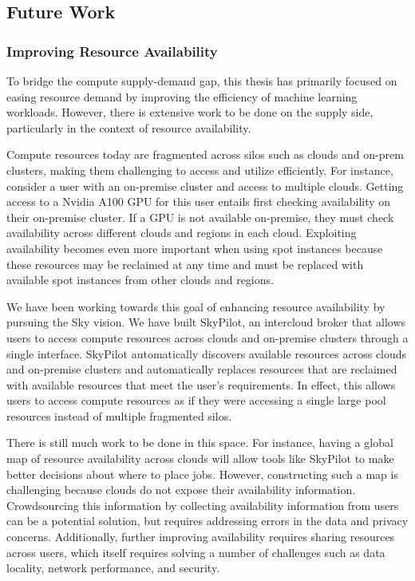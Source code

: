 \subsection{Future Work}

\subsubsection{Improving Resource Availability}
To bridge the compute supply-demand gap, this thesis has primarily focused on easing resource demand by improving the efficiency of machine learning workloads. However, there is extensive work to be done on the supply side, particularly in the context of resource availability.

Compute resources today are fragmented across silos such as clouds and on-prem clusters, making them challenging to access and utilize efficiently. For instance, consider a user with an on-premise cluster and access to multiple clouds. Getting access to a Nvidia A100 GPU for this user entails first checking availability on their on-premise cluster. If a GPU is not available on-premise, they must check availability across different clouds and regions in each cloud. Exploiting availability becomes even more important when using spot instances because these resources may be reclaimed at any time and must be replaced with available spot instances from other clouds and regions.

We have been working towards this goal of enhancing resource availability by pursuing the Sky\cite{skyhotos} vision. We have built SkyPilot\cite{skypilot}, an intercloud broker that allows users to access compute resources across clouds and on-premise clusters through a single interface. SkyPilot automatically discovers available resources across clouds and on-premise clusters and automatically replaces resources that are reclaimed with available resources that meet the user's requirements. In effect, this allows users to access compute resources as if they were accessing a single large pool resources instead of multiple fragmented silos.

There is still much work to be done in this space. For instance, having a global map of resource availability across clouds will allow tools like SkyPilot to make better decisions about where to place jobs. However, constructing such a map is challenging because clouds do not expose their availability information. Crowdsourcing this information by collecting availability information from users can be a potential solution, but requires addressing errors in the data and privacy concerns. Additionally, further improving availability requires sharing resources across users, which itself requires solving a number of challenges such as data locality, network performance, and security.


